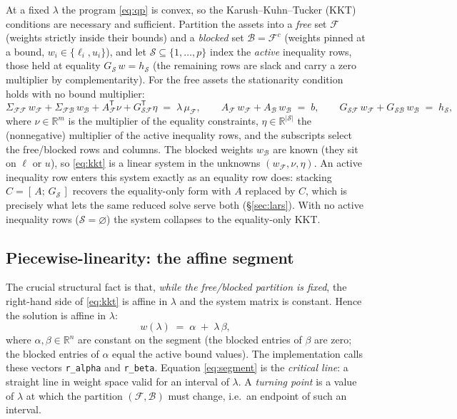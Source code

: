 \documentclass[11pt]{article}
\newcommand{\R}{\mathbb{R}}
\newcommand{\Sig}{\Sigma}
\newcommand{\F}{\mathcal{F}}        %
\newcommand{\B}{\mathcal{B}}        %
\newcommand{\Sset}{\mathcal{S}}     %
\newcommand{\lb}{\ell}              %
\newcommand{\ub}{u}                 %
\newcommand{\trans}{^{\mathsf{T}}}
\begin{document}
At a fixed $\lambda$ the program \eqref{eq:qp} is convex, so the Karush--Kuhn--Tucker
(KKT) conditions are necessary and sufficient. Partition the assets into a
\emph{free} set $\F$ (weights strictly inside their bounds) and a \emph{blocked} set
$\B = \F^{c}$ (weights pinned at a bound, $w_i \in \{\lb_i,\ub_i\}$), and let
$\Sset \subseteq \{1,\dots,p\}$ index the \emph{active} inequality rows, those held at
equality $G_{\Sset}\, w = h_{\Sset}$ (the remaining rows are slack and carry a zero
multiplier by complementarity). For the free assets the stationarity condition holds
with no bound multiplier:
\begin{equation}
\label{eq:kkt}
\Sig_{\F\F}\, w_\F + \Sig_{\F\B}\, w_\B + A_\F\trans \nu + G_{\Sset\F}\trans \eta
  \;=\; \lambda\, \mu_\F,
\qquad
A_\F\, w_\F + A_\B\, w_\B \;=\; b,
\qquad
G_{\Sset\F}\, w_\F + G_{\Sset\B}\, w_\B \;=\; h_{\Sset},
\end{equation}
where $\nu\in\R^m$ is the multiplier of the equality constraints, $\eta\in\R^{|\Sset|}$
the (nonnegative) multiplier of the active inequality rows, and the subscripts select
the free/blocked rows and columns. The blocked weights $w_\B$ are known (they sit on
$\lb$ or $\ub$), so \eqref{eq:kkt} is a linear system in the unknowns
$(w_\F,\nu,\eta)$. An active inequality row enters this system exactly as an equality
row does: stacking $C = [\,A;\,G_{\Sset}\,]$ recovers the equality-only form with $A$
replaced by $C$, which is precisely what lets the same reduced solve serve both
(\S\ref{sec:lars}). With no active inequality rows ($\Sset = \varnothing$) the system
collapses to the equality-only KKT.

\subsection{Piecewise-linearity: the affine segment}

The crucial structural fact is that, \emph{while the free/blocked partition is fixed},
the right-hand side of \eqref{eq:kkt} is affine in $\lambda$ and the system matrix is
constant. Hence the solution is affine in $\lambda$:
\begin{equation}
\label{eq:segment}
w(\lambda) \;=\; \alpha \;+\; \lambda\,\beta,
\end{equation}
where $\alpha,\beta\in\R^n$ are constant on the segment (the blocked entries of $\beta$
are zero; the blocked entries of $\alpha$ equal the active bound values). The
implementation calls these vectors \texttt{r\_alpha} and \texttt{r\_beta}. Equation
\eqref{eq:segment} is the \emph{critical line}: a straight line in weight space valid
for an interval of $\lambda$. A \emph{turning point} is a value of $\lambda$ at which
the partition $(\F,\B)$ must change, i.e.\ an endpoint of such an interval.
\end{document}
